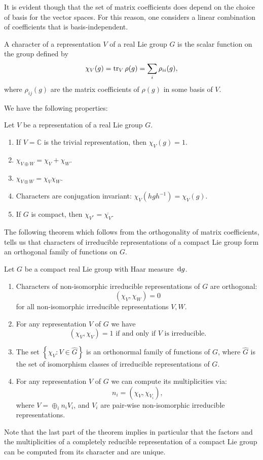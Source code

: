 \documentclass{report}
\begin{document}
It is evident though that the set of matrix coefficients does depend on the choice of basis for the vector spaces.
For this reason, one considers a linear combination of coefficients that is basis-independent.

\begin{definition}
    A character of a representation $V$ of a real Lie group $G$ is the scalar function on the group defined by
    \[
    \chi_V(g) = \operatorname{tr}_V \rho(g) = \sum_i \rho_{ii}(g),
    \]
    where $\rho_{ij}(g)$ are the matrix coefficients of $\rho(g)$ in some basis of $V$.
\end{definition}
We have the following properties:
\begin{proposition}
    Let $V$ be a representation of a real Lie group $G$.
    \begin{enumerate}[label = (\roman*)]
        \item If $V = \mathbb C$ is the trivial representation, then $\chi_V(g) = 1$.
        \item $\chi_{V \oplus W} = \chi_V + \chi_W$.
        \item $\chi_{V \otimes W} = \chi_V \chi_W$.
        \item Characters are conjugation invariant: $\chi_V(hgh^{-1}) = \chi_V(g)$.
        \item If $G$ is compact, then $\chi_{V^*} = \overline{\chi_V}$.
    \end{enumerate}
\end{proposition}

The following theorem which follows from the orthogonality of matrix coefficients, tells us that characters of irreducible representations of a compact Lie group form an orthogonal family of functions on $G$.
\begin{theorem}
    Let $G$ be a compact real Lie group with Haar measure $\,\mathrm{d} g$.
    \begin{enumerate}[label = (\roman*)]
        \item Characters of non-isomorphic irreducible representations of $G$ are orthogonal:
        \[
        \left( \chi_V, \chi_W \right) = 0
        \]
        for all non-isomorphic irreducible representations $V, W$.
        \item For any representation $V$ of $G$ we have 
        \[
            \left( \chi_V, \chi_V \right) = 1 \text{ if and only if } V \text{ is irreducible}.
        \]
        \item The set $\left\{ \chi_V : V \in \hat G \right\}$ is an orthonormal family of functions of $G$, where $\hat G$ is the set of isomorphism classes of irreducible representations of $G$.
        \item For any representation $V$ of $G$ we can compute its multiplicities via:
        \[
        n_i = \left( \chi_V, \chi_{V_i} \right),
        \]
        where $V = \oplus_i n_i V_i$, and $V_i$ are pair-wise non-isomorphic irreducible representations.
    \end{enumerate}
\end{theorem}
Note that the last part of the theorem implies in particular that the factors and the multiplicities of a completely reducible representation of a compact Lie group can be computed from its character and are unique.
\end{document}
